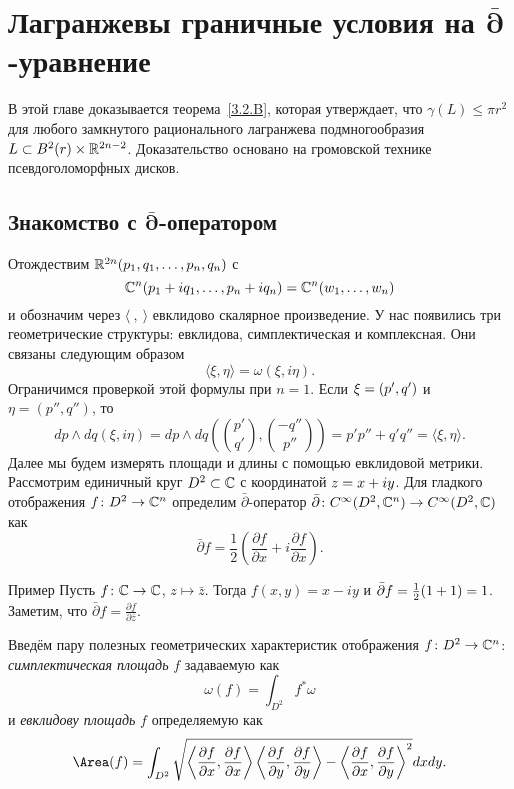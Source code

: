 \chapter
[\texorpdfstring{Лагранжевы граничные условия на $\bar\partial$-уравнение}{Лагранжевы граничные условия на  ̅∂-уравнение}]
{Лагранжевы граничные условия на $\bm{\bar\partial}$-уравнение}

В этой главе доказывается теорема~\ref{3.2.B}, которая утверждает, что $\gamma (L) \le \pi r^2$ для любого замкнутого рационального лагранжева подмногообразия $L \subset B^2 (r) \times \mathbb{R}^{2n-2}$.
Доказательство основано на громовской технике псевдоголоморфных дисков.

\section[\texorpdfstring{Знакомство с $\bar\partial$-оператором}{Знакомство с  ̅∂-оператором}]{Знакомство с $\bm{\bar\partial}$-оператором}\label{sec:4.1}

Отождествим $\mathbb{R}^{2n} (p_1,q_1,\dots, p_n, q_n)$ с 
\[\mathbb{C}^n (p_1 + iq_1,\dots, p_n + iq_n)
=
\mathbb{C}^n (w_1,\dots, w_n)\]
и обозначим через $\langle\ ,\  \rangle$ евклидово скалярное произведение.
У нас появились три геометрические структуры: евклидова, симплектическая и комплексная.
Они связаны следующим образом
\[\langle \xi, \eta\rangle = \omega (\xi, i\eta).\]
Ограничимся проверкой этой формулы при $n = 1$.
Если $\xi \z= (p', q')$ и $\eta = (p'', q'')$, то
\[dp\wedge dq(\xi, i\eta)
=
dp\wedge dq\left(\binom{p'}{q'},\binom{-q''}{p''}\right)
=
p' p'' + q' q''
=
\langle\xi, \eta\rangle.\]
Далее мы будем измерять площади и длины с помощью евклидовой метрики.
Рассмотрим единичный круг $D^2 \subset \mathbb{C}$ с координатой $z \z= x \z+ iy$.
Для гладкого отображения $f\colon D^2 \to \mathbb{C}^n$ определим $\bar\partial$-оператор $\bar\partial\colon C^\infty (D^2, \mathbb{C}^n) \to C^\infty  (D^2, \mathbb{C})$ как 
\[\bar\partial f=\frac12\left(\frac{\partial f}{\partial x} + i \frac{\partial f}{\partial x}\right).\]

\begin{ex*}{Пример}
Пусть $f\colon \mathbb{C} \to \mathbb{C}$, $z \mapsto \bar z$.
Тогда $f(x,y)=x-iy$ и $\bar\partial f \z= \tfrac12(1+1)=1$.
Заметим, что $\bar\partial f  = \frac{\partial f}{\partial \bar z}$.
\end{ex*}

Введём пару полезных геометрических характеристик отображения $f\colon D^2 \to \mathbb{C}^n$:
\emph{симплектическая площадь} $f$ задаваемую как
\[\omega(f) =\int_{D^2}f^\ast\omega\]
и \emph{евклидову площадь} $f$ определяемую как
\[\Area(f)
=\int_{D^2}
\sqrt{
\left\langle\frac{\partial f}{\partial x},\frac{\partial f}{\partial x}\right\rangle
\left\langle \frac{\partial f}{\partial y},\frac{\partial f}{\partial y}\right\rangle
-
\left\langle\frac{\partial f}{\partial x},\frac{\partial f}{\partial y}\right\rangle^2
}
dxdy.
\]

